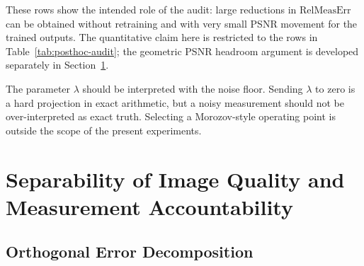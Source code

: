 \documentclass[journal]{IEEEtran}
\newcommand{\RelMeasErr}{\mathrm{RelMeasErr}}
\begin{document}
These rows show the intended role of the audit: large reductions in
$\RelMeasErr$ can be obtained without retraining and with very small PSNR
movement for the trained outputs.  The quantitative claim here is restricted to
the rows in Table~\ref{tab:posthoc-audit}; the geometric PSNR headroom argument
is developed separately in Section~\ref{sec:quality-accountability}.

The parameter $\lambda$ should be interpreted with the noise floor.  Sending
$\lambda$ to zero is a hard projection in exact arithmetic, but a noisy
measurement should not be over-interpreted as exact truth.  Selecting a
Morozov-style operating point is outside the scope of the present experiments.

\section{Separability of Image Quality and Measurement Accountability}
\label{sec:quality-accountability}

\subsection{Orthogonal Error Decomposition}
\end{document}
